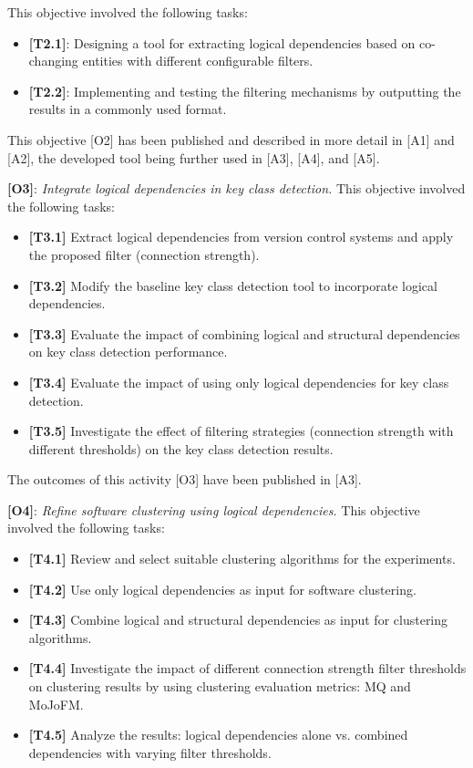This objective involved the following tasks:
\begin{itemize}
\item \textbf{[T2.1]}: Designing a tool for extracting logical dependencies based on co-changing entities with different configurable filters.
\item \textbf{[T2.2]}: Implementing and testing the filtering mechanisms by outputting the results in a commonly used format.
\end{itemize}
This objective [O2] has been published and described in more detail in [A1] and [A2], the developed tool being further used in [A3], [A4], and [A5].



\textbf{[O3]}: \textit{Integrate logical dependencies in key class detection.}
This objective involved the following tasks:
\begin{itemize}
\item \textbf{[T3.1]} Extract logical dependencies from version control systems and apply the proposed filter (connection strength).
\item \textbf{[T3.2]} Modify the baseline key class detection tool to incorporate logical dependencies.
\item \textbf{[T3.3]} Evaluate the impact of combining logical and structural dependencies on key class detection performance.
\item \textbf{[T3.4]} Evaluate the impact of using only logical dependencies for key class detection.
\item \textbf{[T3.5]} Investigate the effect of filtering strategies (connection strength with different thresholds) on the key class detection results.
\end{itemize}
The outcomes of this activity [O3] have been published in [A3].

\textbf{[O4]}: \textit{Refine software clustering using logical dependencies.}
This objective involved the following tasks:
\begin{itemize}
\item \textbf{[T4.1]} Review and select suitable clustering algorithms for the experiments.
\item \textbf{[T4.2]} Use only logical dependencies as input for software clustering.
\item \textbf{[T4.3]} Combine logical and structural dependencies as input for clustering algorithms.
\item \textbf{[T4.4]} Investigate the impact of different connection strength filter thresholds on clustering results by using clustering evaluation metrics: MQ and MoJoFM.
\item \textbf{[T4.5]} Analyze the results: logical dependencies alone vs. combined dependencies with varying filter thresholds.
\end{itemize}

